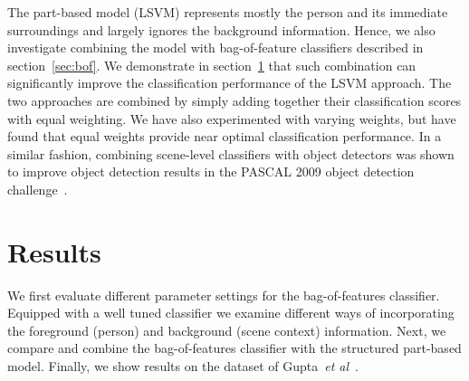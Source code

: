 \documentclass{bmvc2k}
\def\etal{\emph{et al}\bmvaOneDot}
\newcommand{\secnspc}{\vspace*{-2mm}}
\begin{document}
The part-based model (LSVM) represents mostly the person and its immediate surroundings
and largely ignores the background information. Hence, we also investigate
combining the model with bag-of-feature classifiers described in section~\ref{sec:bof}.
We demonstrate in section~\ref{sec:results}  that such combination can significantly improve
the classification performance of the LSVM approach. The two approaches are combined
 by simply adding together their classification scores with equal weighting.
We have also experimented with varying weights, but have found that equal weights provide
near optimal classification performance.
In a similar fashion, combining scene-level classifiers with object detectors was shown to improve object detection results in the PASCAL 2009 object detection challenge~\cite{Harzallah09}.





% 
%




\secnspc
\section{Results}
\label{sec:results}
\secnspc

We first evaluate different parameter settings for the bag-of-features classifier.
Equipped with a well tuned classifier we examine different ways of incorporating the foreground (person)
and background (scene context) information. Next, we compare and combine the bag-of-features classifier
with the structured part-based model. Finally, we show results on the dataset of Gupta~\etal~\cite{Gupta09}.
\end{document}
